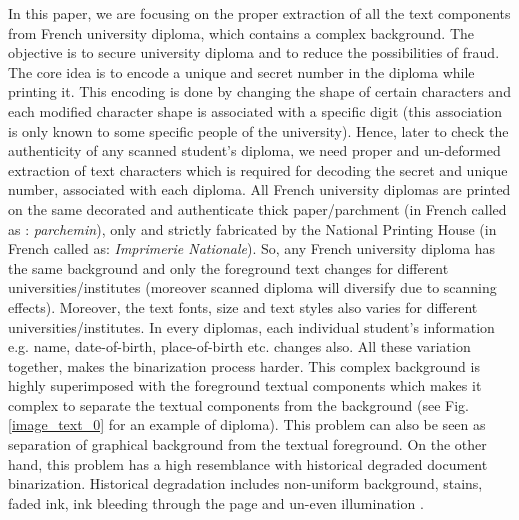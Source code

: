 \documentclass[runningheads]{llncs}
\begin{document}
In this paper, we are focusing on the proper extraction of all the text components from French university diploma, which contains a complex background. The objective is to secure university diploma and to reduce the possibilities of fraud. The core idea is to encode a unique and secret number in the diploma while printing it. This encoding is done by changing the shape of certain characters and each modified character shape is associated with a specific digit (this association is only known to some specific people of the university). Hence, later to check the authenticity of any scanned student's diploma, we need proper and un-deformed extraction of text characters which is required for decoding the secret and unique number, associated with each diploma. 
All French university diplomas are printed on the same decorated and authenticate thick paper/parchment (in French called as : \textit{parchemin}), only and strictly fabricated by the National Printing House (in French called as: \textit{Imprimerie Nationale}). 
So, any French university diploma has the same background and only the foreground text changes for different universities/institutes (moreover scanned diploma will diversify due to scanning effects). Moreover, the text fonts, size and text styles also varies for different universities/institutes. In every diplomas, each individual student's information e.g. name, date-of-birth, place-of-birth etc. changes also. All these variation together, makes the binarization process harder.  
This complex background is highly superimposed with the foreground textual components which makes it complex to separate the textual components from the background (see Fig. \ref{image_text_0} for an example of diploma). This problem can also be seen as separation of graphical background from the textual foreground. On the other hand, this problem has a high resemblance with historical degraded document binarization. Historical degradation includes non-uniform background, stains, faded ink, ink bleeding through the page and un-even illumination \cite{Bataineh2011}.  
\end{document}
